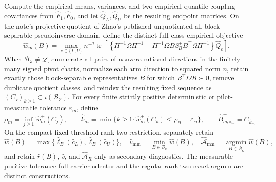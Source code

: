 Compute the empirical means, variances, and two empirical quantile-coupling covariances from \(\widehat F_1,\widehat F_0\), and let \(\widehat Q_L,\widehat Q_U\) be the resulting endpoint matrices.  On the note's projective quotient of Zhao's published unquotiented all-block-separable pseudoinverse domain, define the distinct full-class empirical objective
\[
\widehat w_m^+(B)=
\max_{e\in\{L,U\}}n^{-2}\operatorname{tr}\!\left[
\left\{\Pi^{-1}\Omega\Pi^{-1}
-\Pi^{-1}\Omega B S_B^+B^{\top}\Omega\Pi^{-1}\right\}\widehat Q_e
\right].
\]
When \(\mathcal B_Z\ne\varnothing\), enumerate all pairs of nonzero rational directions in the finitely many signed pivot charts, normalize each arm direction to squared norm \(n\), retain exactly those block-separable representatives \(B\) for which \(B^{\top}\Omega B\succ0\), remove duplicate quotient classes, and reindex the resulting fixed sequence as \((C_k)_{k\ge1}\subset\iota(\mathcal B_Z)\).  For every finite strictly positive deterministic or pilot-measurable tolerance \(\varepsilon_m\), define
\[
 \rho_m=\inf_{j\ge1}\widehat w_m^+(C_j),
 \qquad
 \widehat k_m=
 \min\{k\ge1:\widehat w_m^+(C_k)\le\rho_m+\varepsilon_m\},
 \qquad
 \widehat B_{m,\varepsilon_m}^+=C_{\widehat k_m}.
\]
On the compact fixed-threshold rank-two restriction, separately retain
\[
\widehat w(B)=\max\{\widehat\ell_B(\widehat c_L),\widehat\ell_B(\widehat c_U)\},
\quad
\widehat v_{\mathrm{mm}}=\min_{B\in\mathcal B_\kappa}\widehat w(B),
\quad
\widehat{\mathcal A}_{\mathrm{mm}}=\operatorname*{argmin}_{B\in\mathcal B_\kappa}\widehat w(B),
\]
and retain \(\widehat r(B)\), \(\widehat v\), and \(\widehat{\mathcal A}_R\) only as secondary diagnostics.  The measurable positive-tolerance full-carrier selector and the regular rank-two exact argmin are distinct constructions.